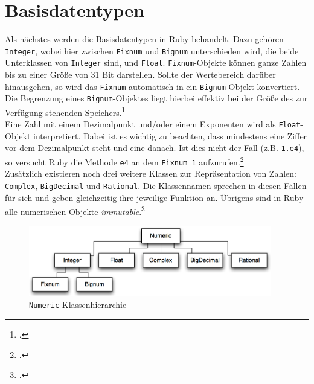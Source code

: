 \documentclass[a4paper, 11pt]{scrreprt}
\begin{document}
\section{Basisdatentypen}
Als nächstes werden die Basisdatentypen in Ruby behandelt. Dazu gehören \texttt{Integer}, wobei hier zwischen \texttt{Fixnum} und \texttt{Bignum} unterschieden wird, die beide Unterklassen von \texttt{Integer} sind, und \texttt{Float}. \texttt{Fixnum}-Objekte können ganze Zahlen bis zu einer Größe von 31 Bit darstellen. Sollte der Wertebereich darüber hinausgehen, so wird das \texttt{Fixnum} automatisch in ein \texttt{Bignum}-Objekt konvertiert. Die Begrenzung eines \texttt{Bignum}-Objektes liegt hierbei effektiv bei der Größe des zur Verfügung stehenden Speichers.\footcite[vgl.][S.315]{p_ruby}\\
Eine Zahl mit einem Dezimalpunkt und/oder einem Exponenten wird als \texttt{Float}-Objekt interpretiert. Dabei ist es wichtig zu beachten, dass mindestens eine Ziffer vor dem Dezimalpunkt steht und eine danach. Ist dies nicht der Fall (z.B. \texttt{1.e4}), so versucht Ruby die Methode \texttt{e4} an dem \texttt{Fixnum 1} aufzurufen.\footcite[vgl.][S.316]{p_ruby}\\
Zusätzlich existieren noch drei weitere Klassen zur Repräsentation von Zahlen: \texttt{Complex}, \texttt{BigDecimal} und \texttt{Rational}. Die Klassennamen sprechen in diesen Fällen für sich und geben gleichzeitig ihre jeweilige Funktion an. Übrigens sind in Ruby alle numerischen Objekte \textit{immutable}.\footcite[vgl.][S.42-43]{ruby_lang}
\begin{figure}[h]
\centering
\caption[\texttt{Numeric} Klassenhierarchie]{\texttt{Numeric} Klassenhierarchie}
\includegraphics[width=400px]{numeric.png}
\end{figure}
\end{document}
